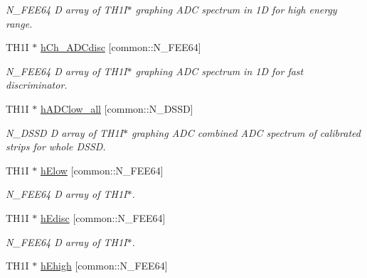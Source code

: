 \begin{DoxyCompactItemize}
\begin{DoxyCompactList}\small\item\em N\-\_\-\-F\-E\-E64 D array of T\-H1\-I$\ast$ graphing A\-D\-C spectrum in 1\-D for high energy range. \end{DoxyCompactList}\item 
\hypertarget{classAnalysis_a41545602157ccbdfafa902ab8cc675e0}{T\-H1\-I $\ast$ \hyperlink{classAnalysis_a41545602157ccbdfafa902ab8cc675e0}{h\-Ch\-\_\-\-A\-D\-Cdisc} \mbox{[}common\-::\-N\-\_\-\-F\-E\-E64\mbox{]}}\label{classAnalysis_a41545602157ccbdfafa902ab8cc675e0}

\begin{DoxyCompactList}\small\item\em N\-\_\-\-F\-E\-E64 D array of T\-H1\-I$\ast$ graphing A\-D\-C spectrum in 1\-D for fast discriminator. \end{DoxyCompactList}\item 
\hypertarget{classAnalysis_af017884cee08db1ec1358fe4d3424aca}{T\-H1\-I $\ast$ \hyperlink{classAnalysis_af017884cee08db1ec1358fe4d3424aca}{h\-A\-D\-Clow\-\_\-all} \mbox{[}common\-::\-N\-\_\-\-D\-S\-S\-D\mbox{]}}\label{classAnalysis_af017884cee08db1ec1358fe4d3424aca}

\begin{DoxyCompactList}\small\item\em N\-\_\-\-D\-S\-S\-D D array of T\-H1\-I$\ast$ graphing A\-D\-C combined A\-D\-C spectrum of calibrated strips for whole D\-S\-S\-D. \end{DoxyCompactList}\item 
\hypertarget{classAnalysis_ae38834865c6f470c5e456b05481ad142}{T\-H1\-I $\ast$ \hyperlink{classAnalysis_ae38834865c6f470c5e456b05481ad142}{h\-Elow} \mbox{[}common\-::\-N\-\_\-\-F\-E\-E64\mbox{]}}\label{classAnalysis_ae38834865c6f470c5e456b05481ad142}

\begin{DoxyCompactList}\small\item\em N\-\_\-\-F\-E\-E64 D array of T\-H1\-I$\ast$. \end{DoxyCompactList}\item 
\hypertarget{classAnalysis_aebd7767cf5a0e53f346747d70f731615}{T\-H1\-I $\ast$ \hyperlink{classAnalysis_aebd7767cf5a0e53f346747d70f731615}{h\-Edisc} \mbox{[}common\-::\-N\-\_\-\-F\-E\-E64\mbox{]}}\label{classAnalysis_aebd7767cf5a0e53f346747d70f731615}

\begin{DoxyCompactList}\small\item\em N\-\_\-\-F\-E\-E64 D array of T\-H1\-I$\ast$. \end{DoxyCompactList}\item 
\hypertarget{classAnalysis_a1cf7e07383444641c5d5d279e763d58b}{T\-H1\-I $\ast$ \hyperlink{classAnalysis_a1cf7e07383444641c5d5d279e763d58b}{h\-Ehigh} \mbox{[}common\-::\-N\-\_\-\-F\-E\-E64\mbox{]}}\label{classAnalysis_a1cf7e07383444641c5d5d279e763d58b}


\end{DoxyCompactItemize}
